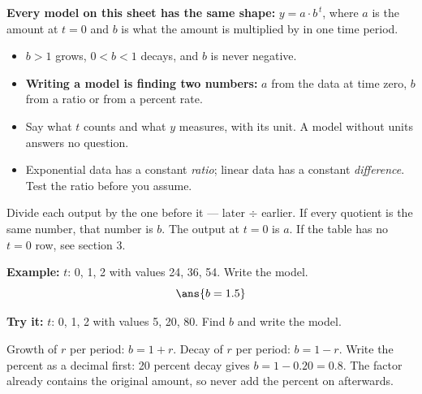\documentclass[12pt]{article}
\begin{document}

\begin{formulabox}
\textbf{Every model on this sheet has the same shape:} $y = a\cdot b^{\,t}$,
where $a$ is the amount at $t = 0$ and $b$ is what the amount is multiplied by
in one time period.
\begin{itemize}[leftmargin=0.9cm, itemsep=1pt, topsep=1pt]
\item $b > 1$ grows, $0 < b < 1$ decays, and $b$ is never negative.
\item \textbf{Writing a model is finding two numbers:} $a$ from the data at
time zero, $b$ from a ratio or from a percent rate.
\item Say what $t$ counts and what $y$ measures, with its unit. A model without
units answers no question.
\item Exponential data has a constant \emph{ratio}; linear data has a constant
\emph{difference}. Test the ratio before you assume.
\end{itemize}
\end{formulabox}


\begin{formulabox}
Divide each output by the one before it --- later $\div$ earlier. If every
quotient is the same number, that number is $b$. The output at $t = 0$ is $a$.
If the table has no $t = 0$ row, see section 3.
\end{formulabox}

\begin{examplebox}
\textbf{Example:} $t$: 0, 1, 2 with values 24, 36, 54. Write the model.
\[ \ans{b = 1.5} \]
\end{examplebox}

\begin{tryitbox}
\textbf{Try it:} $t$: 0, 1, 2 with values 5, 20, 80. Find $b$ and write the
model.

\end{tryitbox}


\begin{formulabox}
Growth of $r$ per period: $b = 1 + r$. Decay of $r$ per period: $b = 1 - r$.
Write the percent as a decimal first: 20 percent decay gives
$b = 1 - 0.20 = 0.8$. The factor already contains the original amount, so never
add the percent on afterwards.
\end{formulabox}
\end{document}

